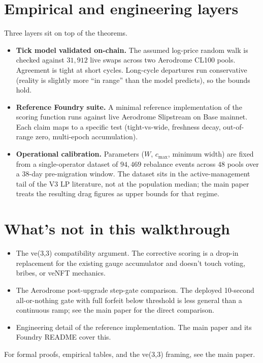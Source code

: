 \documentclass[11pt,a4paper]{article}
\begin{document}
\section{Empirical and engineering layers}

Three layers sit on top of the theorems.

\begin{itemize}[leftmargin=2em]
\item \textbf{Tick model validated on-chain.} The assumed log-price random walk is checked against $31{,}912$ live swaps across two Aerodrome CL100 pools. Agreement is tight at short cycles. Long-cycle departures run conservative (reality is slightly more ``in range'' than the model predicts), so the bounds hold.
\item \textbf{Reference Foundry suite.} A minimal reference implementation of the scoring function runs against live Aerodrome Slipstream on Base mainnet. Each claim maps to a specific test (tight-vs-wide, freshness decay, out-of-range zero, multi-epoch accumulation).
\item \textbf{Operational calibration.} Parameters ($W$, $c_{\max}$, minimum width) are fixed from a single-operator dataset of $94{,}469$ rebalance events across $48$ pools over a $38$-day pre-migration window. The dataset sits in the active-management tail of the V3 LP literature, not at the population median; the main paper treats the resulting drag figures as upper bounds for that regime.
\end{itemize}

\section{What's not in this walkthrough}

\begin{itemize}[leftmargin=2em]
\item The ve(3,3) compatibility argument. The corrective scoring is a drop-in replacement for the existing gauge accumulator and doesn't touch voting, bribes, or veNFT mechanics.
\item The Aerodrome post-upgrade step-gate comparison. The deployed 10-second all-or-nothing gate with full forfeit below threshold is less general than a continuous ramp; see the main paper for the direct comparison.
\item Engineering detail of the reference implementation. The main paper and its Foundry README cover this.
\end{itemize}

For formal proofs, empirical tables, and the ve(3,3) framing, see the main paper.
\end{document}
